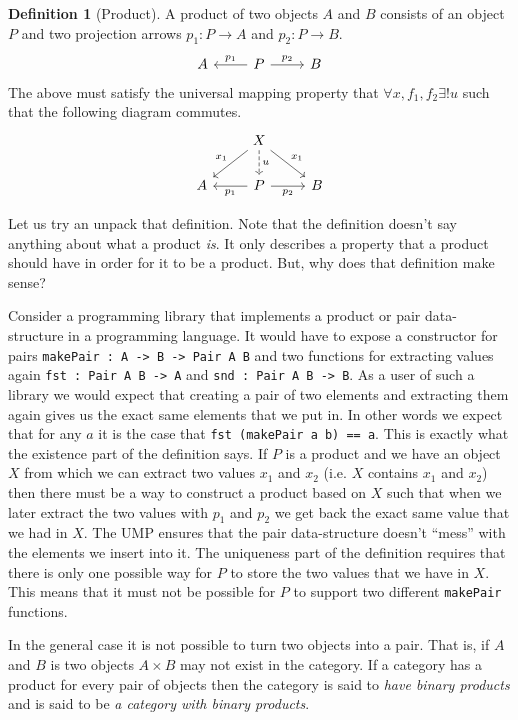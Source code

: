 \documentclass{book}
\theoremstyle{definition}
\newtheorem{definition}{Definition}[section]
\newcommand{\arr}[3]{#1 : #2 \rightarrow #3}
\begin{document}
\begin{definition}[Product]
  A product of two objects $A$ and $B$ consists of an object $P$ and two
  projection arrows $\arr{p_1}{P}{A}$ and $\arr{p_2}{P}{B}$.
  \[
    \begin{tikzcd}
      A & P \arrow[l, "p_1"'] \arrow[r, "p_2"] & B
    \end{tikzcd}
  \]
  The above must satisfy the universal mapping property that
  $\forall x, f_1, f_2 \exists! u$ such that the following diagram commutes.
  \[
    \begin{tikzcd}
      & X \arrow[ld, "x_1"'] \arrow[d, dashrightarrow, "u"] \arrow[rd, "x_1"] \\
      A & P \arrow[l, "p_1"] \arrow[r, "p_2"'] & B
    \end{tikzcd}
  \]
\end{definition}

Let us try an unpack that definition. Note that the definition doesn't say
anything about what a product \emph{is}. It only describes a property that a
product should have in order for it to be a product. But, why does that
definition make sense?

Consider a programming library that implements a product or pair data-structure
in a programming language. It would have to expose a constructor for pairs
\texttt{makePair : A -> B -> Pair A B} and two functions for extracting values
again \texttt{fst : Pair A B -> A} and \texttt{snd : Pair A B -> B}. As a user
of such a library we would expect that creating a pair of two elements and
extracting them again gives us the exact same elements that we put in. In other
words we expect that for any $a$ it is the case that \texttt{fst (makePair a b)
  == a}. This is exactly what the existence part of the definition says. If $P$
is a product and we have an object $X$ from which we can extract two values
$x_1$ and $x_2$ (i.e. $X$ contains $x_1$ and $x_2$) then there must be a way to
construct a product based on $X$ such that when we later extract the two values
with $p_1$ and $p_2$ we get back the exact same value that we had in $X$. The
UMP ensures that the pair data-structure doesn't ``mess'' with the elements we
insert into it. The uniqueness part of the definition requires that there is
only one possible way for $P$ to store the two values that we have in $X$. This
means that it must not be possible for $P$ to support two different
\texttt{makePair} functions.

In the general case it is not possible to turn two objects into a pair. That is,
if $A$ and $B$ is two objects $A \times B$ may not exist in the category. If a
category has a product for every pair of objects then the category is said to
\emph{have binary products} and is said to be \emph{a category with binary
  products}.
\end{document}
